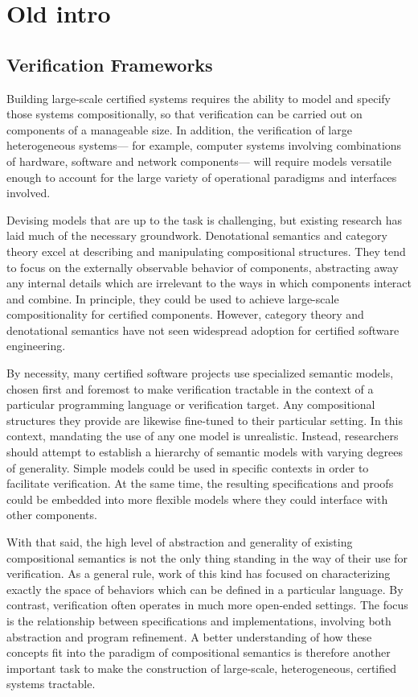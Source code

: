 \documentclass[acmsmall,screen,review,anonymous]{acmart}
\begin{document}
\section{Old intro}

\subsection{Verification Frameworks} \label{sec:intro:bigpict} %

Building large-scale certified systems
requires the ability
to model and specify those systems compositionally,
so that verification can be carried out
on components of a manageable size.
In addition,
the verification of large heterogeneous systems---%
for example,
computer systems involving combinations of
hardware, software and network components---%
will require models versatile enough
to account for the large variety of
operational paradigms and interfaces involved.

Devising models that are up to the task is challenging,
but existing research has laid much of the necessary groundwork.
Denotational semantics and category theory
excel at describing and manipulating compositional structures.
They tend to focus on the externally observable behavior of components,
abstracting away any internal details which are irrelevant
to the ways in which components interact and combine.
In principle,
they could be used to achieve
large-scale compositionality for certified components.
However,
category theory and denotational semantics
have not seen widespread adoption
for certified software engineering.

By necessity,
many certified software projects use
specialized semantic models,
chosen first and foremost
to make verification tractable
in the context of a particular
programming language or verification target.
Any compositional structures they provide
are likewise fine-tuned to their particular setting.
In this context,
mandating the use of any one model
is unrealistic.
Instead,
researchers should attempt to establish
a hierarchy of semantic models
with varying degrees of generality.
Simple models could be used
in specific contexts in order to facilitate verification.
At the same time,
the resulting specifications and proofs
could be embedded into more flexible models
where they could interface
with other components.

With that said,
the high level of abstraction and generality of
existing compositional semantics
is not the only thing
standing in the way of their use for verification.
As a general rule,
work of this kind has focused on characterizing exactly
the space of behaviors which can be defined in a particular language.
By contrast,
verification often operates in much more open-ended settings.
The focus is the relationship between specifications and implementations,
involving both abstraction and program refinement.
A better understanding of how these concepts fit into
the paradigm of compositional semantics
is therefore another important task
to make the construction of
large-scale, heterogeneous, certified systems
tractable.
\end{document}
